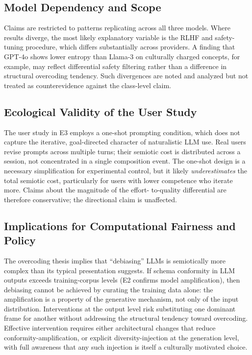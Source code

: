 \documentclass[12pt,a4paper]{article}
\begin{document}
\subsection{Model Dependency and Scope}

Claims are restricted to patterns replicating across all three models. Where
results diverge, the most likely explanatory variable is the RLHF and
safety-tuning procedure, which differs substantially across providers. A
finding that GPT-4o shows lower entropy than Llama-3 on culturally charged
concepts, for example, may reflect differential safety filtering rather than
a difference in structural overcoding tendency. Such divergences are noted and
analyzed but not treated as counterevidence against the class-level claim.

\subsection{Ecological Validity of the User Study}

The user study in E3 employs a one-shot prompting condition, which does not
capture the iterative, goal-directed character of naturalistic LLM use. Real
users revise prompts across multiple turns; their semiotic cost is distributed
across a session, not concentrated in a single composition event. The one-shot
design is a necessary simplification for experimental control, but it likely
\emph{underestimates} the total semiotic cost, particularly for users with
lower competence who iterate more. Claims about the magnitude of the effort-
to-quality differential are therefore conservative; the directional claim
is unaffected.

\subsection{Implications for Computational Fairness and Policy}

The overcoding thesis implies that ``debiasing'' LLMs is semiotically more
complex than its typical presentation suggests. If schema conformity in LLM
outputs exceeds training-corpus levels (E2 confirms model amplification), then
debiasing cannot be achieved by curating the training data alone: the amplification
is a property of the generative mechanism, not only of the input distribution.
Interventions at the output level risk substituting one dominant frame for
another without addressing the structural tendency toward overcoding. Effective
intervention requires either architectural changes that reduce conformity-amplification,
or explicit diversity-injection at the generation level, with full awareness
that any such injection is itself a culturally motivated choice.
\end{document}
